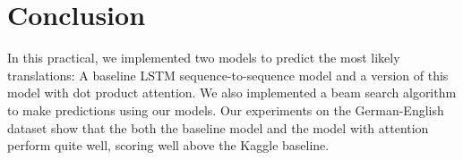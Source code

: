 \documentclass[11pt]{article}
\begin{document}
\section{Conclusion}
In this practical, we implemented two models to predict the most likely translations: A baseline LSTM sequence-to-sequence model and a version of this model with dot product attention. We also implemented a beam search algorithm to make predictions using our models. Our experiments on the German-English dataset show that the both the baseline model and the model with attention perform quite well, scoring well above the Kaggle baseline.



\nocite{*}

\end{document}
